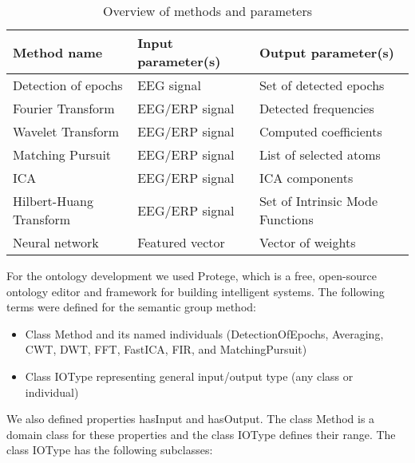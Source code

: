 \documentclass[a4paper,twoside]{article}
\begin{document}
\begin{table}[h]
\caption{Overview of methods and parameters}\label{tab:example1} \centering
\begin{tabular}{|p{2cm}|p{2cm}|p{2cm}|}
  \hline
  Method name & Input parameter(s) & Output parameter(s) \\
  \hline
  Detection of epochs & EEG signal &  Set of detected epochs \\
  \hline
  Fourier Transform & EEG/ERP signal &  Detected frequencies \\
  \hline
  Wavelet Transform & EEG/ERP signal &  Computed coefficients \\
  \hline
  Matching Pursuit & EEG/ERP signal &  List of selected atoms \\
  \hline
  ICA & EEG/ERP signal &  ICA components \\
  \hline
  Hilbert-Huang Transform & EEG/ERP signal & Set of Intrinsic Mode Functions \\
  \hline
  Neural network & Featured vector & Vector of weights \\
  \hline
\end{tabular}
\end{table}


For the ontology development we used Protege, which is a free, open-source ontology editor and framework for building intelligent systems. The following terms were defined for the semantic group method:
\begin{itemize}
\item Class Method and its named individuals (DetectionOfEpochs, Averaging, CWT, DWT, FFT, FastICA, FIR, and MatchingPursuit)
\item Class IOType representing general input/output type (any class or individual)
\end{itemize}

We also defined properties hasInput and hasOutput. The class Method is a domain class for these properties and the class IOType defines their range. The class IOType has the following subclasses:
\end{document}
